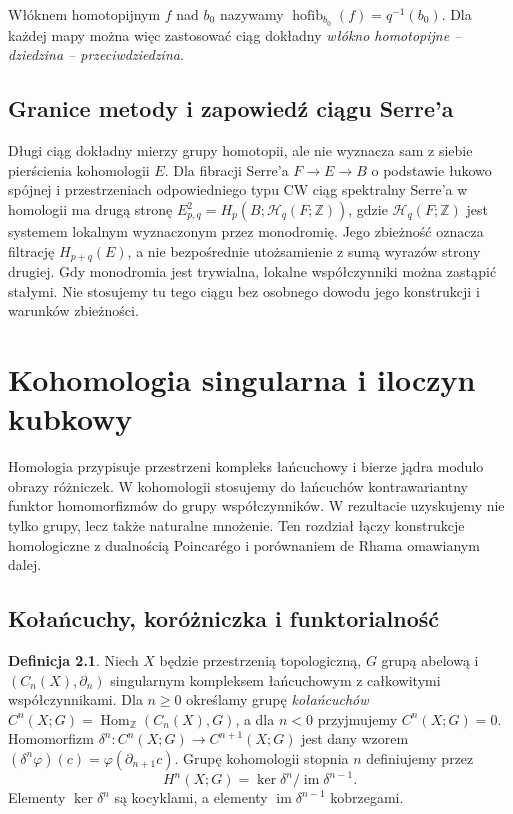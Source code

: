 \documentclass[11pt,a4paper,oneside]{report}
\newcommand{\Z}{\mathbb{Z}}
\theoremstyle{plain}
\theoremstyle{definition}
\newtheorem{definicja}[twierdzenie]{Definicja}
\theoremstyle{remark}
\begin{document}
Włóknem homotopijnym $f$ nad $b_0$ nazywamy
$\operatorname{hofib}_{b_0}(f)=q^{-1}(b_0)$.
Dla każdej mapy można więc zastosować ciąg dokładny
\emph{włókno homotopijne -- dziedzina -- przeciwdziedzina}.

\section{Granice metody i zapowiedź ciągu Serre'a}
Długi ciąg dokładny mierzy grupy homotopii, ale nie wyznacza
sam z siebie pierścienia kohomologii $E$. Dla fibracji Serre'a
$F\to E\to B$ o podstawie łukowo spójnej i przestrzeniach
odpowiedniego typu CW ciąg spektralny Serre'a w homologii
ma drugą stronę
$E^2_{p,q}=H_p(B;\mathcal H_q(F;\Z))$,
gdzie $\mathcal H_q(F;\Z)$ jest systemem lokalnym wyznaczonym
przez monodromię. Jego zbieżność oznacza filtrację $H_{p+q}(E)$,
a nie bezpośrednie utożsamienie z sumą wyrazów strony drugiej.
Gdy monodromia jest trywialna, lokalne współczynniki można
zastąpić stałymi. Nie stosujemy tu tego ciągu bez osobnego
dowodu jego konstrukcji i warunków zbieżności.
\clearpage

\chapter{Kohomologia singularna i iloczyn kubkowy}
\label{ch:kohomologia-singularna}

Homologia przypisuje przestrzeni kompleks łańcuchowy i bierze jądra
modulo obrazy różniczek. W kohomologii stosujemy do łańcuchów
kontrawariantny funktor homomorfizmów do grupy współczynników.
W rezultacie uzyskujemy nie tylko grupy, lecz także naturalne mnożenie.
Ten rozdział łączy konstrukcje homologiczne z dualnością Poincarégo
i porównaniem de Rhama omawianym dalej.

\section{Kołańcuchy, koróżniczka i funktorialność}

\begin{definicja}
Niech $X$ będzie przestrzenią topologiczną, $G$ grupą abelową i
$(C_n(X),\partial_n)$ singularnym kompleksem łańcuchowym z całkowitymi
współczynnikami. Dla $n\geq0$ określamy grupę \emph{kołańcuchów}
$C^n(X;G)=\operatorname{Hom}_{\Z}(C_n(X),G)$, a dla $n<0$ przyjmujemy
$C^n(X;G)=0$. Homomorfizm
$\delta^n:C^n(X;G)\to C^{n+1}(X;G)$ jest dany wzorem
$(\delta^n\varphi)(c)=\varphi(\partial_{n+1}c)$.
Grupę kohomologii stopnia $n$ definiujemy przez
\[
H^n(X;G)=\ker\delta^n/\operatorname{im}\delta^{n-1}.
\]
Elementy $\ker\delta^n$ są kocyklami, a elementy
$\operatorname{im}\delta^{n-1}$ kobrzegami.
\end{definicja}
\end{document}
